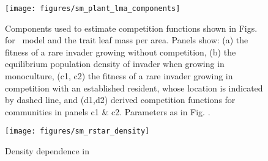 \documentclass[10pt,twoside]{article}
\begin{document}
\begin{figure}[h]
 \centering
 \texttt{[image: figures/sm\_plant\_lma\_components]}
 \caption{Components used to estimate competition functions shown in Figs.
 {\figPlantLma} for \plant\ model and the trait leaf mass per area.
  Panels show: (a) the fitness of a rare invader growing without competition,
  (b) the equilibrium population density of invader when growing in monoculture,
  (c1, c2) the fitness of a rare invader growing in competition with an established
  resident, whose location is indicated by dashed line, and (d1,d2) derived competition
  functions for communities in panels  c1 \& c2. Parameters as in Fig.
  {\figPlantLma}.}
  \label{fig:sm_plant_lma_components}
\end{figure}

\begin{figure}[h]
  \centering
  \texttt{[image: figures/sm\_rstar\_density]}
  \caption{Density dependence in \Rstar}
  \label{fig:rstar_density_dependence}
\end{figure}

% 
% 
\end{document}
